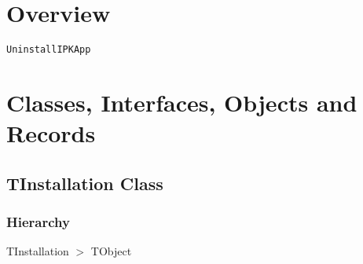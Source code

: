 \documentclass{report}
\newif\ifpdf
\begin{document}
\section{Overview}
\begin{description}
\item[\texttt{\begin{ttfamily}TInstallation\end{ttfamily} Class}]
\end{description}
\begin{description}
\item[\texttt{UninstallIPKApp}]
\end{description}
\section{Classes, Interfaces, Objects and Records}
\ifpdf
\subsection*{\large{\textbf{TInstallation Class}}\normalsize\hspace{1ex}\hrulefill}
\else
\subsection*{TInstallation Class}
\fi
\label{ipkhandle.TInstallation}
\subsubsection*{\large{\textbf{Hierarchy}}\normalsize\hspace{1ex}\hfill}
TInstallation {$>$} TObject
\end{document}
